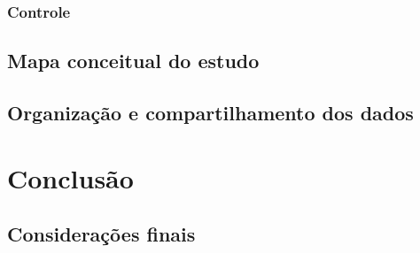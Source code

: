 \subsection{Controle}
\label{ssec:control}




\section{Mapa conceitual do estudo}
\label{sec:mapa}




\section{Organização e compartilhamento dos dados}
\label{sec:org}



\chapter{Conclusão}
\label{chap:conclu}


\section{Considerações finais}
\label{sec:consider}